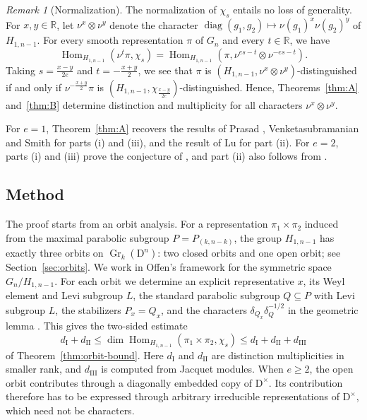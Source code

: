 \documentclass[11pt]{amsart}
\numberwithin{equation}{section}
\theoremstyle{plain}
\theoremstyle{definition}
\theoremstyle{remark}
\newtheorem{remark}[theorem]{Remark}
\newcommand{\R}{\mathbb{R}}
\newcommand{\one}{\mathds{1}}
\DeclareMathOperator{\Hom}{Hom}
\DeclareMathOperator{\Gr}{Gr}
\DeclareMathOperator{\diag}{diag}
\newcommand{\dI}{d_{\mathrm{I}}}
\newcommand{\dII}{d_{\mathrm{II}}}
\newcommand{\dIII}{d_{\mathrm{III}}}
\begin{document}
\begin{remark}[Normalization]\label{rem:normalization}
	The normalization of $\chi_s$ entails no loss of generality. For $x,y\in\R$, let $\nu^x\otimes\nu^y$ denote the character $\diag(g_1,g_2)\mapsto\nu(g_1)^x\nu(g_2)^y$ of $H_{1,n-1}$. For every smooth representation $\pi$ of $G_n$ and every $t\in\R$, we have $$\Hom_{H_{1,n-1}}(\nu^t\pi,\chi_s)=\Hom_{H_{1,n-1}}(\pi,\nu^{es-t}\otimes\nu^{-es-t}).$$ Taking $s=\frac{x-y}{2e}$ and $t=-\frac{x+y}2$, we see that $\pi$ is $(H_{1,n-1},\nu^x\otimes\nu^y)$-distinguished if and only if $\nu^{-\frac{x+y}2}\pi$ is $(H_{1,n-1},\chi_{\frac{x-y}{2e}})$-distinguished. Hence, Theorems~\ref{thm:A} and~\ref{thm:B} determine distinction and multiplicity for all characters $\nu^x\otimes\nu^y$. 
\end{remark}

For $e=1$, Theorem~\ref{thm:A} recovers the results of Prasad \cite{Pra93}, Venketasubramanian \cite{Ven13} and Smith \cite[Corollary~A.2.2]{Smi17} for parts (i) and (iii), and the result of Lu \cite[Theorem 1.3]{Lu22} for part (ii). For $e=2$, parts (i) and (iii) prove the conjecture of \cite[Conjecture 1.1]{DS26}, and part (ii) also follows from \cite[Theorem 1.1]{LLX26}.

\subsection{Method}

The proof starts from an orbit analysis. For a representation $\pi_1\times\pi_2$ induced from the maximal parabolic subgroup $P=P_{(k,n-k)}$, the group $H_{1,n-1}$ has exactly three orbits on $\Gr_k(\mathrm{D}^n)$: two closed orbits and one open orbit; see Section~\ref{sec:orbits}. We work in Offen's framework \cite{Off17} for the symmetric space $G_n/H_{1,n-1}$. For each orbit we determine an explicit representative $x$, its Weyl element and Levi subgroup $L$, the standard parabolic subgroup $Q\subseteq P$ with Levi subgroup $L$, the stabilizers $P_x=Q_x$, and the characters $\delta_{Q_x}\delta_Q^{-1/2}$ in the geometric lemma \cite[Proposition~4.1]{Off17}. This gives the two-sided estimate
$$\dI+\dII\le\dim\Hom_{H_{1,n-1}}(\pi_1\times\pi_2,\chi_s)\le\dI+\dII+\dIII$$
of Theorem~\ref{thm:orbit-bound}. Here $\dI$ and $\dII$ are distinction multiplicities in smaller rank, and $\dIII$ is computed from Jacquet modules. When $e\ge2$, the open orbit contributes through a diagonally embedded copy of $\mathrm{D}^\times$. Its contribution therefore has to be expressed through arbitrary irreducible representations of $\mathrm{D}^\times$, which need not be characters.
\end{document}
